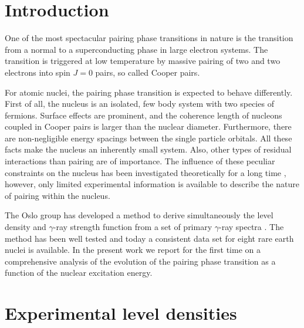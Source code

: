 \begin{multicols}{2}

\section{Introduction}

One of the most spectacular pairing phase transitions in nature is the 
transition from a normal to a superconducting phase in large electron systems. 
The transition is triggered at low temperature by massive pairing of two and 
two electrons into spin $J=0$ pairs, so called Cooper pairs\cite{BC57}.

For atomic nuclei, the pairing phase transition is expected to behave 
differently. First of all, the nucleus is an isolated, few body system with two
species of fermions. Surface effects are prominent, and the coherence length of
nucleons coupled in Cooper pairs is larger than the nuclear diameter. 
Furthermore, there are non-negligible energy spacings between the single 
particle orbitals. All these facts make the nucleus an inherently small system.
Also, other types of residual interactions than pairing are of importance. The 
influence of these peculiar constraints on the nucleus has been investigated 
theoretically for a long time \cite{SY63,Mo72,TS80,Go81}, however, only limited
experimental information is available to describe the nature of pairing within 
the nucleus.

The Oslo group has developed a method to derive simultaneously the level 
density and $\gamma$-ray strength function from a set of primary $\gamma$-ray 
spectra \cite{SB00}. The method has been well tested and today a consistent 
data set for eight rare earth nuclei is available. In the present work we 
report for the first time on a comprehensive analysis of the evolution of the 
pairing phase transition as a function of the nuclear excitation energy.

\section{Experimental level densities}


\end{multicols}
